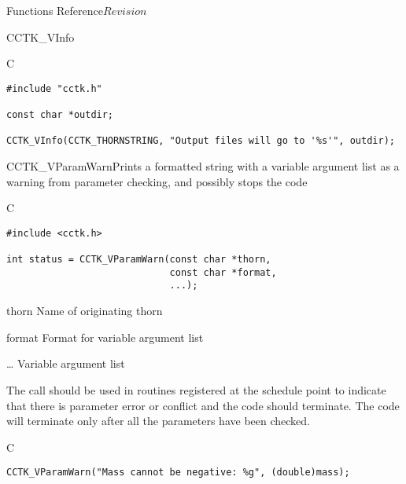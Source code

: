\begin{cactuspart}{ Functions Reference}{}{$Revision$}
\begin{FunctionDescription}{CCTK\_VInfo}
\begin{ExampleSection}
\begin{Example}{C}
\begin{verbatim}
#include "cctk.h"

const char *outdir;

CCTK_VInfo(CCTK_THORNSTRING, "Output files will go to '%s'", outdir);
\end{verbatim}
\end{Example}
\end{ExampleSection}
\end{FunctionDescription}


\begin{FunctionDescription}{CCTK\_VParamWarn}{Prints a formatted string with a variable argument list as a warning from parameter checking, and possibly stops the code}
\label{CCTK-VParamWarn}
\begin{SynopsisSection}
\begin{Synopsis}{C}
\begin{verbatim}
#include <cctk.h>

int status = CCTK_VParamWarn(const char *thorn,
                             const char *format,
                             ...);
\end{verbatim}
\end{Synopsis}
\end{SynopsisSection}
\begin{ParameterSection}
\begin{Parameter}{thorn}
Name of originating thorn
\end{Parameter}
\begin{Parameter}{format}
Format for variable argument list
\end{Parameter}
\begin{Parameter}{\ldots}
Variable argument list
\end{Parameter}
\end{ParameterSection}
\begin{Discussion}
The call should be used in routines registered at the schedule point 
to indicate that there is parameter error or conflict and the code should
terminate. The code will terminate only after all the parameters have been
checked.
\end{Discussion}
\begin{ExampleSection}
\begin{Example}{C}
\begin{verbatim}
CCTK_VParamWarn("Mass cannot be negative: %g", (double)mass);
\end{verbatim}
\end{Example}
\end{ExampleSection}


\end{FunctionDescription}
\end{cactuspart}
